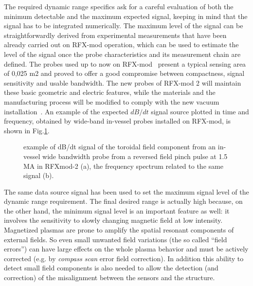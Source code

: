 The required dynamic range specifics ask for a careful evaluation of both the minimum detectable and the maximum expected signal, keeping in mind that the signal has to be integrated numerically.  
The maximum level of the signal can be straightforwardly derived from experimental measurements that have been already carried out on RFX-mod operation, which can be used to estimate the level of the signal once the probe characteristics and its measurement chain are defined. 
The probes used up to now on RFX-mod~\cite{pomaro2005transducers} present a typical sensing area of 0,025 m2 and proved to offer a good compromise between compactness, signal sensitivity and usable bandwidth. The new probes of RFX-mod 2 will maintain these basic geometric and electric features, while the materials and the manufacturing process will be modified to comply with the new vacuum installation~\cite{MARCHIORI2017892}. 
An example of the expected $dB/dt$ signal source plotted in time and frequency, obtained by wide-band in-vessel probes installed on RFX-mod, is shown in Fig.\ref{fig:em_signal_raw}.
%
\begin{figure}[ht]
\centering
{}
\caption{example of dB/dt signal of the toroidal field component from an in-vessel wide bandwidth probe from a reversed field pinch pulse at 1.5 MA in RFXmod-2 (a), the frequency spectrum related to the same signal (b).}
\label{fig:em_signal_raw}
\end{figure}
%
The same data source signal has been used to set the maximum signal level of the dynamic range requirement.
The final desired range is actually high because, on the other hand, the minimum signal level is an important feature as well: it involves the sensitivity to slowly changing magnetic field at low intensity. 
Magnetized plasmas are prone to amplify the spatial resonant components of external fields. So even small unwanted field variations (the so called “field errors”) can have large effects on the whole plasma behavior and must be actively corrected (e.g. by \textit{compass scan} error field correction).
In addition this ability to detect small field components is also needed to allow the detection (and correction) of the misalignment between the sensors and the structure. 

